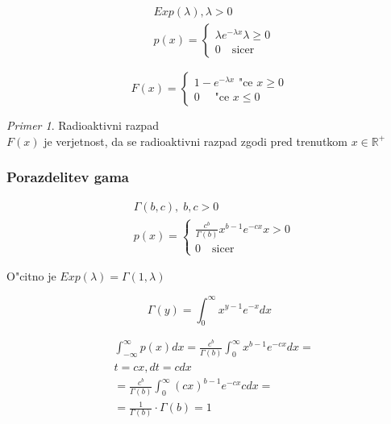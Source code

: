 \documentclass[a4paper,12pt]{article}
\theoremstyle{definition}
\theoremstyle{remark}
\newtheorem*{ex}{Primer}
\newcommand{\R}{\mathbb{R}}
\begin{document}
\begin{align*}
    &Exp(\lambda), \lambda > 0 \\
    &p(x) = \begin{cases}
            \lambda e^{-\lambda x} \lambda \geq 0 \\
            0 \quad \text{sicer}
        \end{cases}
\end{align*}

\begin{equation*}
    F(x) = \begin{cases}
        1 - e^{-\lambda x} \text{ "ce } x \geq 0 \\
        0 \quad \text{ "ce } x \leq 0
    \end{cases}
\end{equation*}

\begin{ex}
    Radioaktivni razpad \\
    $F(x)$ je verjetnost, da se radioaktivni razpad zgodi pred trenutkom $x \in \R^{+}$
\end{ex}

\subsubsection{Porazdelitev gama}

\begin{align*}
    &\Gamma(b,c), \; b, c > 0 \\
    &p(x) = \begin{cases}
            \frac{c^b}{\Gamma(b)} x^{b-1} e^{-cx} x > 0 \\
            0 \quad \text{sicer}
        \end{cases}
\end{align*}

O"citno je $Exp(\lambda) = \Gamma(1, \lambda)$

\begin{equation*}
    \Gamma(y) = \int_{0}^{\infty} x^{y-1} e^{-x} dx
\end{equation*}

\begin{align*}
    &\int_{-\infty}^{\infty} p(x) dx = \frac{c^b}{\Gamma(b)} \int_{0}^{\infty} x^{b-1} e^{-cx} dx = \\
    &t = cx, dt = c dx \\
    &= \frac{c^b}{\Gamma(b)} \int_{0}^{\infty} (cx)^{b-1} e^{-cx} c dx = \\
    &= \frac{1}{\Gamma(b)} \cdot \Gamma(b) = 1
\end{align*}
\end{document}
